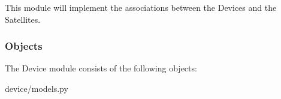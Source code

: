 This module will implement the associations between the Devices and the Satellites. 

\subsubsection{Objects}

The Device module consists of the following objects:

\begin{table}
\caption{device/models.py}

\end{table}